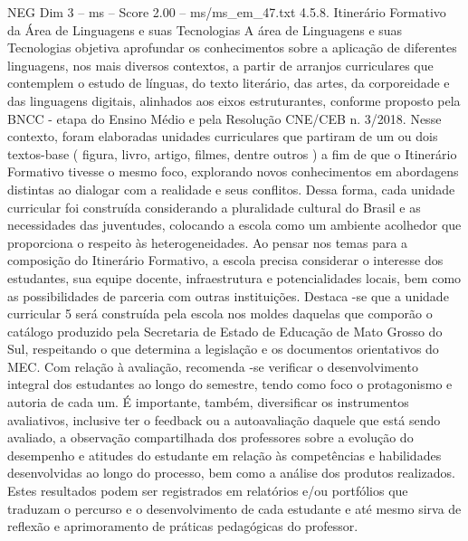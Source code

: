 \begin{textsample}{NEG Dim 3 – ms – Score 2.00 – ms/ms\_em\_47.txt}  \label{ex:f3_neg_100}
4.5.8.
Itinerário Formativo da Área de Linguagens e suas Tecnologias A área de Linguagens e suas Tecnologias objetiva aprofundar os conhecimentos sobre a aplicação de diferentes linguagens, nos mais diversos contextos, a partir de arranjos curriculares que contemplem o estudo de línguas, do texto literário, das artes, da corporeidade e das linguagens digitais, alinhados aos eixos estruturantes, conforme proposto pela BNCC - etapa do Ensino Médio e pela Resolução CNE/CEB n. 3/2018.
Nesse contexto, foram elaboradas unidades curriculares que partiram de um ou dois textos-base ( figura, livro, artigo, filmes, dentre outros ) a fim de que o Itinerário Formativo tivesse o mesmo foco, explorando novos conhecimentos em abordagens distintas ao dialogar com a realidade e seus conflitos.
Dessa forma, cada unidade curricular foi construída considerando a pluralidade cultural do Brasil e as necessidades das juventudes, colocando a escola como um ambiente acolhedor que proporciona o respeito às heterogeneidades.
Ao pensar nos temas para a composição do Itinerário Formativo, a escola precisa considerar o interesse dos estudantes, sua equipe docente, infraestrutura e potencialidades locais, bem como as possibilidades de parceria com outras instituições.
Destaca -se que a unidade curricular 5 será construída pela escola nos moldes daquelas que comporão o catálogo produzido pela Secretaria de Estado de Educação de Mato Grosso do Sul, respeitando o que determina a legislação e os documentos orientativos do MEC.
Com relação à avaliação, recomenda -se verificar o desenvolvimento integral dos estudantes ao longo do semestre, tendo como foco o protagonismo e autoria de cada um.
É importante, também, diversificar os instrumentos avaliativos, inclusive ter o feedback ou a autoavaliação daquele que está sendo avaliado, a observação compartilhada dos professores sobre a evolução do desempenho e atitudes do estudante em relação às competências e habilidades desenvolvidas ao longo do processo, bem como a análise dos produtos realizados.
Estes resultados podem ser registrados em relatórios e/ou portfólios que traduzam o percurso e o desenvolvimento de cada estudante e até mesmo sirva de reflexão e aprimoramento de práticas pedagógicas do professor.

\end{textsample}
